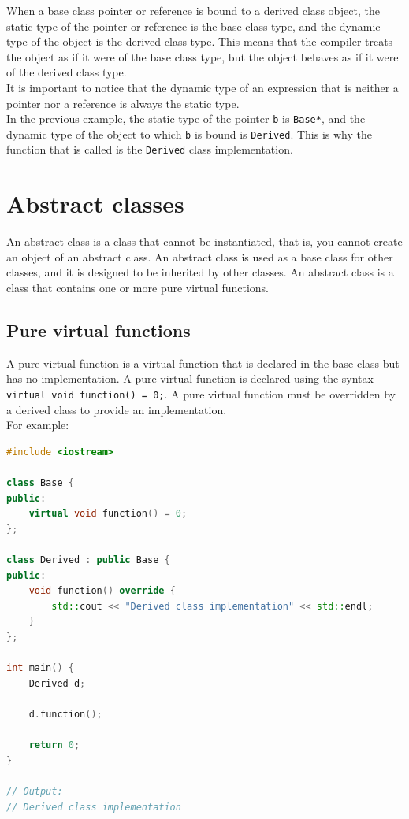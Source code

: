 When a base class pointer or reference is bound to a derived class object, the static type
of the pointer or reference is the base class type, and the dynamic type of the object is
the derived class type. This means that the compiler treats the object as if it were of the
base class type, but the object behaves as if it were of the derived class type.\\

It is important to notice that the dynamic type of an expression that is neither a pointer
nor a reference is always the static type.\\

In the previous example, the static type of the pointer \texttt{b} is \texttt{Base*}, and the
dynamic type of the object to which \texttt{b} is bound is \texttt{Derived}. This is why the
function that is called is the \texttt{Derived} class implementation.

\section{Abstract classes}

An abstract class is a class that cannot be instantiated, that is, you cannot create an object
of an abstract class. An abstract class is used as a base class for other classes, and it is
designed to be inherited by other classes. An abstract class is a class that contains one or
more pure virtual functions.

\subsection{Pure virtual functions}

A pure virtual function is a virtual function that is declared in the base class but has no
implementation. A pure virtual function is declared using the syntax \texttt{virtual void function() = 0;}.
A pure virtual function must be overridden by a derived class to provide an implementation.\\

For example:\\

\begin{lstlisting}[language=C++]
#include <iostream>

class Base {
public:
    virtual void function() = 0;
};

class Derived : public Base {
public:
    void function() override {
        std::cout << "Derived class implementation" << std::endl;
    }
};

int main() {
    Derived d;

    d.function();

    return 0;
}

// Output:
// Derived class implementation
\end{lstlisting}

